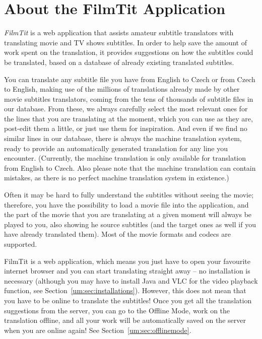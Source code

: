 \label{chap:users_manual}

\section{About the FilmTit Application}

\emph{FilmTit} is a web application that assists amateur subtitle translators with translating movie and TV shows subtitles. In order to help save the amount of work spent on the translation, it provides suggestions on how the subtitles could be translated, based on a database of already existing translated subtitles.

You can translate any subtitle file you have from English to Czech or from Czech to English, making use of the millions of translations already made by other movie subtitles translators, coming from the tens of thousands of subtitle files in our database. From these, we always carefully select the most relevant ones for the lines that you are translating at the moment, which you can use as they are, post-edit them a little, or just use them for inspiration. And even if we find no similar lines in our database, there is always the machine translation system, ready to provide an automatically generated translation for any line you encounter. (Currently, the machine translation is only available for translation from English to Czech. Also please note that the machine translation can contain mistakes, as there is no perfect machine translation system in existence.)

Often it may be hard to fully understand the subtitles without seeing the movie; therefore, you have the possibility to load a movie file into the application, and the part of the movie that you are translating at a given moment will  always be played to you, also showing he source subtitles (and the target ones as well if you have already translated them). Most of the movie formats and codecs are supported.

FilmTit is a web application, which means you just have to open your favourite internet browser and you can start translating straight away -- no installation is necessary (although you may have to install Java and VLC for the video playback function, see Section~\ref{um:sec:installations}). However, this does not mean that you have to be online to translate the subtitles! Once you get all the translation suggestions from the server, you can go to the Offline Mode, work on the translation offline, and all your work will be automatically saved on the server when you are online again! See Section~\ref{um:sec:offlinemode}.

